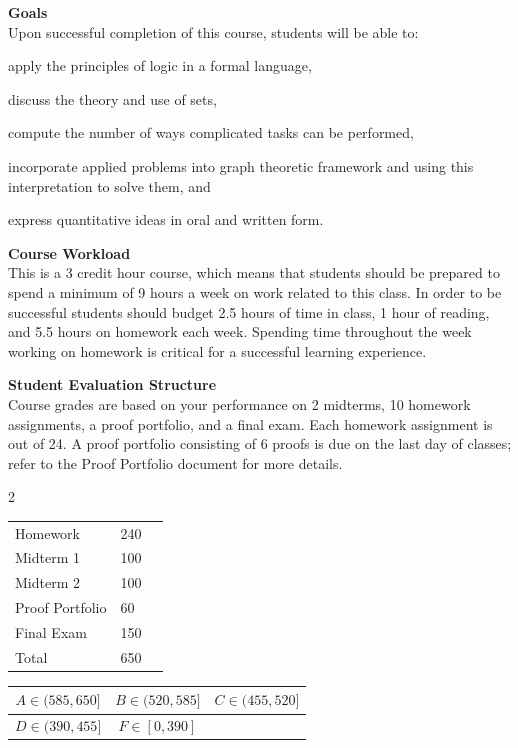\documentclass[11pt]{article}
\newenvironment{packed_item}{
\begin{itemize}
  \setlength{\itemsep}{1pt}
  \setlength{\parskip}{0pt}
  \setlength{\parsep}{0pt}
}{\end{itemize}}
\newcommand{\slice}[4]{
  \pgfmathparse{0.5*#1+0.5*#2}
  \let\midangle\pgfmathresult

  \draw[thick,fill=black!10] (0,0) -- (#1:1) arc (#1:#2:1) -- cycle;

  \node[label=\midangle:#4] at (\midangle:1) {};

  \pgfmathparse{min((#2-#1-10)/110*(-0.3),0)}
  \let\temp\pgfmathresult
  \pgfmathparse{max(\temp,-0.5) + 0.8}
  \let\innerpos\pgfmathresult
  \node at (\midangle:\innerpos) {#3};
}
\begin{document}
{\bf Goals}\\
Upon successful completion of this course, students will be able to:
\begin{packed_item}
\item apply the principles of logic in a formal language,
\item discuss the theory and use of sets,
\item compute the number of ways complicated tasks can be performed,
\item incorporate applied problems into graph theoretic framework and using this interpretation to solve them, and
\item express quantitative ideas in oral and written form.
\end{packed_item}

{\bf Course Workload}\\
This is a 3 credit hour course, which means that students should be prepared to spend a minimum of 9 hours a week on work related to this class.  In order to be successful students should budget 2.5 hours of time in class, 1 hour of reading, and 5.5 hours on homework each week.  Spending time throughout the week working on homework is critical for a successful learning experience.

{\bf Student Evaluation Structure}\\
Course grades are based on your performance on 2 midterms, 10 homework assignments, a proof portfolio, and a final exam.  Each homework assignment is out of 24.  A proof portfolio consisting of 6 proofs is due on the last day of classes; refer to the Proof Portfolio document for more details.

\begin{multicols}{2}


\begin{tabular}{lll}
Homework & 240 \\
Midterm 1 & 100 \\
Midterm 2 & 100 \\
Proof Portfolio & 60 \\
Final Exam & 150 \\ \hline
Total & 650
\end{tabular}


\begin{tabular}{|c|c|c|} \hline
$ A \in (585,650]$  & $B \in (520,585]$  & $C \in (455,520]$\\ \hline
  $D \in (390,455]$ & $F \in [0,390]$& \\  \hline
\end{tabular}



\end{multicols}
\end{document}
